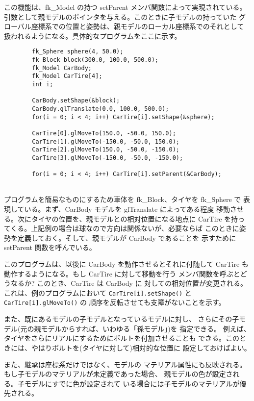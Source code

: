 この機能は、fk\_Model の持つ setParent メンバ関数によって実現されている。
引数として親モデルのポインタを与える。このときに子モデルの持っていた
グローバル座標系での位置と姿勢は、親モデルのローカル座標系でのそれとして
扱われるようになる。具体的なプログラムをここに示す。
\\
\begin{breakbox}
\begin{verbatim}
        fk_Sphere sphere(4, 50.0);
        fk_Block block(300.0, 100.0, 500.0);
        fk_Model CarBody;
        fk_Model CarTire[4];
        int i;

        CarBody.setShape(&block);
        CarBody.glTranslate(0.0, 100.0, 500.0);
        for(i = 0; i < 4; i++) CarTire[i].setShape(&sphere);

        CarTire[0].glMoveTo(150.0, -50.0, 150.0);
        CarTire[1].glMoveTo(-150.0, -50.0, 150.0);
        CarTire[2].glMoveTo(150.0, -50.0, -150.0);
        CarTire[3].glMoveTo(-150.0, -50.0, -150.0);

        for(i = 0; i < 4; i++) CarTire[i].setParent(&CarBody);
\end{verbatim}
\end{breakbox}
~ \\
プログラムを簡易なものにするため車体を fk\_Block、タイヤを fk\_Sphere で
表現している。まず、CarBody モデルを glTranslate によってある程度
移動させる。次にタイヤの位置を、親モデルとの相対位置になる地点に
CarTire を持ってくる。上記例の場合は球なので方向は関係ないが、必要ならば
このときに姿勢を定義しておく。そして、親モデルが CarBody であることを
示すために setParent 関数を呼んでいる。

このプログラムは、以後に CarBody を動作させるとそれに付随して
CarTire も動作するようになる。もし CarTire に対して移動を行う
メンバ関数を呼ぶとどうなるか? このとき、CarTire は CarBody に
対しての相対位置が変更される。これは、例のプログラムにおいて
{\tt CarTire[i].setShape()} と {\tt CarTire[i].glMoveTo()} の
順序を反転させても支障がないことを示す。

また、既にあるモデルの子モデルとなっているモデルに対し、
さらにその子モデル(元の親モデルからすれば、いわゆる「孫モデル」)を
指定できる。
例えば、タイヤをさらにリアルにするためにボルトを付加させることも
できる。このときには、やはりボルトを(タイヤに対して)相対的な位置に
設定しておけばよい。

また、継承は座標系だけではなく、モデルの
マテリアル属性にも反映される。もし子モデルのマテリアルが未定義であった場合、
親モデルの色が設定される。子モデルにすでに色が設定されて
いる場合には子モデルのマテリアルが優先される。

